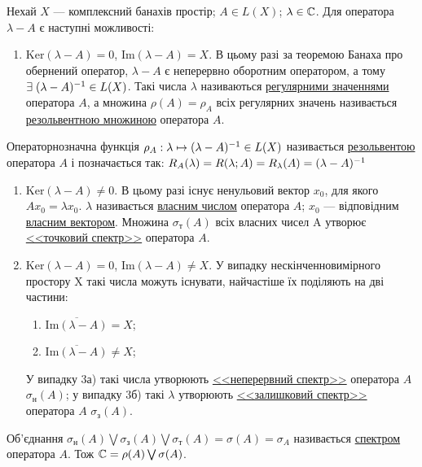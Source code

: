 
\begin{theory}
    Нехай $X$ --- комплексний банахів простір; $A \in L(X)$; $\lambda \in \mathbb{C}$.
    Для оператора $\lambda - A$ є наступні можливості:
    \begin{enumerate}[label=\arabic*)]
        \item ${\mathrm{Ker}(\lambda - A) = {0}}$, ${\mathrm{Im}(\lambda - A)} = X$. В цьому разі 
        за теоремою Банаха про обернений оператор, $\lambda - A$ є неперервно оборотним 
        оператором, а тому $\exists \; (\lambda - A)^{-1} \in L(X)$. Такі числа $\lambda$ 
        називаються \ul{регулярними значеннями}  оператора $A$, а множина 
        {$\rho(A) = \rho_A$} всіх регулярних значень називається 
        \ul{резольвентною множиною} оператора $A$.
    \end{enumerate}
    Операторнозначна функція $\rho_A : \lambda \mapsto (\lambda - A)^{-1} \in L(X)$ 
    називається \ul{резольвентою} оператора $A$ і позначається так:
    $R_A(\lambda) = R(\lambda; A) = R_\lambda(A) = (\lambda - A)^{-1}$
    \begin{enumerate}[label=\arabic*), resume]
        \item $\mathrm{Ker}(\lambda - A) \neq {0}$. В цьому разі існує ненульовий вектор $x_0$, 
        для якого $Ax_0 = \lambda x_0$. $\lambda$ називається 
        \ul{власним числом} оператора $A$; $x_0$ --- відповідним \ul{власним вектором}.
        Множина $\sigma_\text{т}(A)$ всіх власних чисел A утворює 
        \uline{<<точковий спектр>>} оператора $A$.
        \item $\mathrm{Ker}(\lambda - A) = {0}$, $\mathrm{Im}(\lambda - A) \neq X$. 
        У випадку нескінченновимірного простору X такі числа можуть існувати,
        найчастіше їх поділяють на дві частини:
        \begin{enumerate}[label = \ukr*)]
            \item $\overline{\mathrm{Im}(\lambda - A)} = X$;
            \item $\overline{\mathrm{Im}(\lambda - A)} \neq X$;
        \end{enumerate}
        У випадку 3а) такі числа утворюють \uline{<<неперервний спектр>>} оператора $A$ {$\sigma_\text{н}(A)$}; у випадку 3б) такі $\lambda$ 
        утворюють \uline{<<залишковий спектр>>} оператора $A$ {$\sigma_\text{з}(A)$}. 
    \end{enumerate}
    Об'єднання $\sigma_\text{н}(A) \bigvee \sigma_\text{з}(A) \bigvee \sigma_\text{т}(A) = {\sigma(A) = \sigma_A}$ називається 
    \ul{спектром} оператора $A$. Тож $\mathbb{C} = \rho(A) \bigvee \sigma(A)$.
\end{theory}


